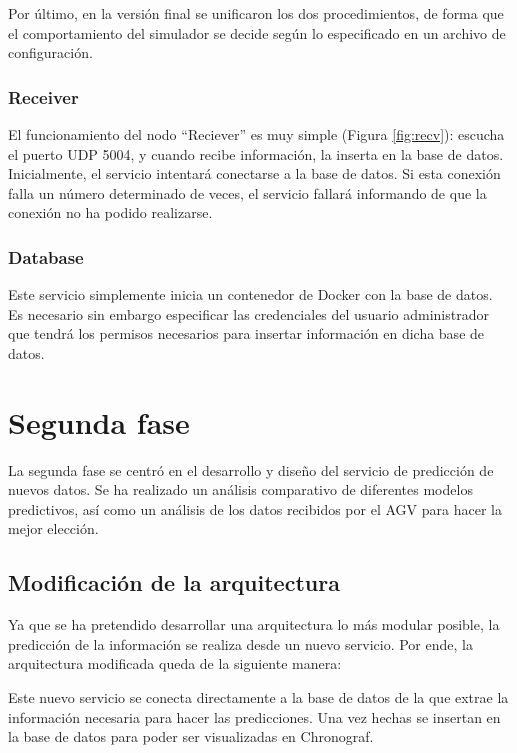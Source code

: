Por último, en la versión final se unificaron los dos procedimientos, de forma que el comportamiento del simulador
se decide según lo especificado en un archivo de configuración.

\subsubsection{Receiver}

El funcionamiento del nodo ``Reciever'' es muy simple (Figura \ref{fig:recv}): escucha el puerto UDP 5004, y cuando recibe información, la inserta 
en la base de datos. Inicialmente, el servicio intentará conectarse a la base de datos. Si esta conexión falla un número
determinado de veces, el servicio fallará informando de que la conexión no ha podido realizarse.


\subsubsection{Database}

Este servicio simplemente inicia un contenedor de Docker con la base de datos. Es necesario sin embargo 
especificar las credenciales del usuario administrador que tendrá los permisos necesarios para insertar 
información en dicha base de datos.

\section{Segunda fase}

La segunda fase se centró en el desarrollo y diseño del servicio de predicción de nuevos datos.
Se ha realizado un análisis comparativo de diferentes modelos predictivos, así como un análisis
de los datos recibidos por el AGV para hacer la mejor elección.

\subsection{Modificación de la arquitectura}

Ya que se ha pretendido desarrollar una arquitectura lo más modular posible, la predicción de la 
información se realiza desde un nuevo servicio. Por ende, la arquitectura modificada queda de la 
siguiente manera:


Este nuevo servicio se conecta directamente a la base de datos de la que extrae la 
información necesaria para hacer las predicciones. Una vez hechas se insertan en la base de datos 
para poder ser visualizadas en Chronograf.

